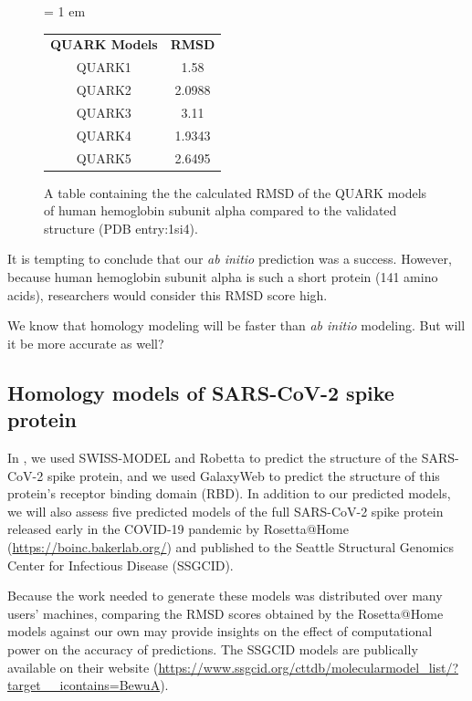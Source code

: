\begin{figure}[h]
	\centering
	\tabcolsep = 1 em
	\mySfFamily
	\begin{tabular}{c c}
		\textbf{QUARK Models} & \textbf{RMSD} \\
		QUARK1 & 1.58 \\
		QUARK2 & 2.0988 \\
		QUARK3 & 3.11 \\
		QUARK4 & 1.9343 \\
		QUARK5 & 2.6495 \\
	\end{tabular}
	\caption{A table containing the the calculated RMSD of the QUARK models of human hemoglobin subunit alpha compared to the validated structure (PDB entry:1si4).}
	\label{fig:quark_rmsd_table}
\end{figure}

It is tempting to conclude that our \textit{ab initio} prediction was a success. However, because human hemoglobin subunit alpha is such a short protein (141 amino acids), researchers would consider this RMSD score high.

We know that homology modeling will be faster than \textit{ab initio} modeling. But will it be more accurate as well?

\FloatBarrier
{}
\subsection{Homology models of SARS-CoV-2 spike protein}

In , we used SWISS-MODEL and Robetta to predict the structure of the SARS-CoV-2 spike protein, and we used GalaxyWeb to predict the structure of this protein's receptor binding domain (RBD). In addition to our predicted models, we will also assess five predicted models of the full SARS-CoV-2 spike protein released early in the COVID-19 pandemic by Rosetta@Home (\url{https://boinc.bakerlab.org/}) and published to the Seattle Structural Genomics Center for Infectious Disease (SSGCID).

Because the work needed to generate these models was distributed over many users' machines, comparing the RMSD scores obtained by the Rosetta@Home models against our own may provide insights on the effect of computational power on the accuracy of predictions. The SSGCID models are publically available on their website (\url{https://www.ssgcid.org/cttdb/molecularmodel_list/?target__icontains=BewuA}).

